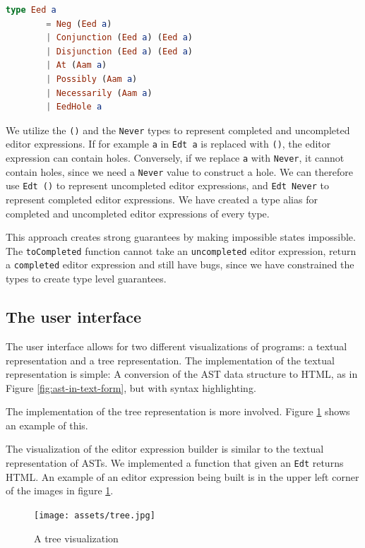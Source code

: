 \begin{lstlisting}[language=elm,%
                   label="eed-definitions",%
                   gobble=4,%
                   ]
    type Eed a
        = Neg (Eed a)
        | Conjunction (Eed a) (Eed a)
        | Disjunction (Eed a) (Eed a)
        | At (Aam a)
        | Possibly (Aam a)
        | Necessarily (Aam a)
        | EedHole a
\end{lstlisting}

We utilize the \texttt{()} and the \texttt{Never} types to represent
completed and uncompleted editor expressions. If for example \texttt{a} in
\texttt{Edt a} is replaced with \texttt{()}, the editor expression can contain
holes. Conversely, if we replace \texttt{a} with \texttt{Never}, it cannot
contain holes, since we need a \texttt{Never} value to construct a hole. We can
therefore use \texttt{Edt ()} to represent uncompleted editor expressions, and
\texttt{Edt Never} to represent completed editor expressions. We have created a
type alias for completed and uncompleted editor expressions of every type.

This approach creates strong guarantees by making impossible states impossible.
The \texttt{toCompleted} function cannot take an \texttt{uncompleted} editor
expression, return a \texttt{completed} editor expression and still have bugs,
since we have constrained the types to create type level guarantees.

\subsection{The user interface}
\label{user-interface}

The user interface allows for two different visualizations of programs: a
textual representation and a tree representation. The implementation of the
textual representation is simple: A conversion of the AST data structure to
HTML, as in Figure \ref{fig:ast-in-text-form}, but with syntax highlighting.

The implementation of the tree representation is more involved. Figure
\ref{fig:final_ui} shows an example of this.

The visualization of the editor expression builder is similar to the textual
representation of ASTs. We implemented a function that given an \texttt{Edt}
returns HTML. An example of an
editor expression being built is in the upper left corner of the images in
figure \ref{fig:final_ui}.

\begin{figure}
  \begin{center}
    \texttt{[image: assets/tree.jpg]}
  \end{center}
  \caption{A tree visualization}
  \label{fig:final_ui}
\end{figure}



